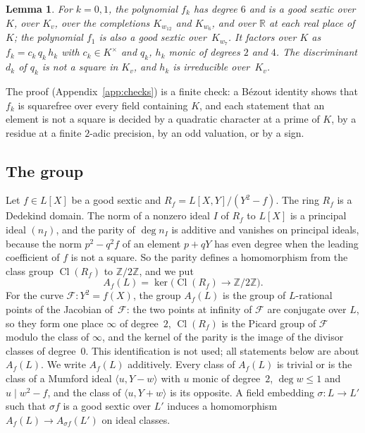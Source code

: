 \documentclass[11pt]{amsart}
\newtheorem{lemma}[theorem]{Lemma}
\theoremstyle{definition}
\numberwithin{equation}{section}
\newcommand{\Z}{\mathbb{Z}}
\newcommand{\kv}{K_v}
\newcommand{\Cl}{\operatorname{Cl}}
\newcommand{\lean}[1]{\ignorespaces}
\begin{document}
\begin{lemma}\label{lem:fk}\lean{FurioLombardo.Discharge.M3a.Bruin.goodSextic_fRev, FurioLombardo.Discharge.M3a.Bruin.goodSextic_fRev_Kv, FurioLombardo.Discharge.SelmerBasis.W2.goodSextic_w2, FurioLombardo.Discharge.SelmerBasis.W3.goodSextic_w3, FurioLombardo.Discharge.SelmerBasis.W7.goodSextic_w7, FurioLombardo.Discharge.SelmerBasis.goodSextic_real, FurioLombardo.Discharge.M3a.Bruin.d_not_isSquare_Kv, FurioLombardo.Discharge.M3a.Bruin.irr_Kv, FurioLombardo.Discharge.M3a.Bruin.fRev_eq_mul, FurioLombardo.Discharge.M3a.Bruin.q_monic_natDegree, FurioLombardo.Discharge.M3a.Bruin.h_monic_natDegree}
For $k=0,1$, the polynomial $f_k$ has degree $6$ and is a good sextic over $K$, over $\kv$, over the completions $K_{w_{12}}$ and $K_{w_6}$, and over $\mathbb R$ at each real place of~$K$; the polynomial $f_1$ is also a good sextic over~$K_{w_7}$. It factors over $K$ as $f_k=c_k\,q_k\,h_k$ with $c_k\in K^\times$ and $q_k$, $h_k$ monic of degrees $2$ and $4$. The discriminant $d_k$ of $q_k$ is not a square in $\kv$, and $h_k$ is irreducible over~$\kv$.
\end{lemma}

The proof (Appendix~\ref{app:checks}) is a finite check: a B\'ezout identity shows that $f_k$ is squarefree over every field containing $K$, and each statement that an element is not a square is decided by a quadratic character at a prime of $K$, by a residue at a finite $2$-adic precision, by an odd valuation, or by a sign.

\subsection{The group}\label{sec:group}\lean{FurioLombardo.M3a.Genus2.Jac, FurioLombardo.Discharge.M3a.jac_eq_one_or_reduced, FurioLombardo.M3a.Genus2.jacMap, FurioLombardo.M3a.Genus2.mu, FurioLombardo.M3a.Genus2.muJ, FurioLombardo.M3a.Genus2.muJ_jacMap}
Let $f\in L[X]$ be a good sextic and $R_f=L[X,Y]/(Y^2-f)$. The ring $R_f$ is a Dedekind domain. The norm of a nonzero ideal $I$ of $R_f$ to $L[X]$ is a principal ideal $(n_I)$, and the parity of $\deg n_I$ is additive and vanishes on principal ideals, because the norm $p^2-q^2f$ of an element $p+qY$ has even degree when the leading coefficient of $f$ is not a square. So the parity defines a homomorphism from the class group $\Cl(R_f)$ to $\Z/2\Z$, and we put
\[
A_f(L)=\ker\bigl(\Cl(R_f)\to\Z/2\Z\bigr).
\]
For the curve $\mathcal F:Y^2=f(X)$, the group $A_f(L)$ is the group of $L$-rational points of the Jacobian of~$\mathcal F$: the two points at infinity of $\mathcal F$ are conjugate over $L$, so they form one place $\infty$ of degree~$2$, $\Cl(R_f)$ is the Picard group of $\mathcal F$ modulo the class of $\infty$, and the kernel of the parity is the image of the divisor classes of degree~$0$. This identification is not used; all statements below are about $A_f(L)$. We write $A_f(L)$ additively. Every class of $A_f(L)$ is trivial or is the class of a Mumford ideal $\langle u,Y-w\rangle$ with $u$ monic of degree~$2$, $\deg w\le1$ and $u\mid w^2-f$, and the class of $\langle u,Y+w\rangle$ is its opposite. A field embedding $\sigma:L\to L'$ such that $\sigma f$ is a good sextic over $L'$ induces a homomorphism $A_f(L)\to A_{\sigma f}(L')$ on ideal classes.
\end{document}
